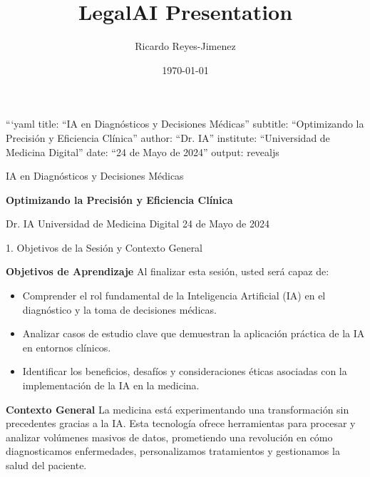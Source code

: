 \documentclass[aspectratio=169]{beamer}
\title[LegalAI Presentation]{LegalAI Presentation}
\subtitle{}
\author{Ricardo Reyes-Jimenez}
\institute{Universidad de La Sabana}
\date{\today}
\begin{document}
\begin{frame}
  \titlepage
\end{frame}

\usebackgroundtemplate{}



\begin{frame}[fragile]{}
```yaml
title: ``IA en Diagnósticos y Decisiones Médicas''
subtitle: ``Optimizando la Precisión y Eficiencia Clínica''
author: ``Dr. IA''
institute: ``Universidad de Medicina Digital''
date: ``24 de Mayo de 2024''
output: revealjs
\end{frame}



\begin{frame}[fragile]{IA en Diagnósticos y Decisiones Médicas}

\textbf{Optimizando la Precisión y Eficiencia Clínica}

Dr. IA
Universidad de Medicina Digital
24 de Mayo de 2024

\end{frame}



\begin{frame}[fragile]{1. Objetivos de la Sesión y Contexto General}


\textbf{Objetivos de Aprendizaje}
Al finalizar esta sesión, usted será capaz de:
\begin{itemize}
  \item Comprender el rol fundamental de la Inteligencia Artificial (IA) en el diagnóstico y la toma de decisiones médicas.
  \item Analizar casos de estudio clave que demuestran la aplicación práctica de la IA en entornos clínicos.
  \item Identificar los beneficios, desafíos y consideraciones éticas asociadas con la implementación de la IA en la medicina.
\end{itemize}
\textbf{Contexto General}
La medicina está experimentando una transformación sin precedentes gracias a la IA. Esta tecnología ofrece herramientas para procesar y analizar volúmenes masivos de datos, prometiendo una revolución en cómo diagnosticamos enfermedades, personalizamos tratamientos y gestionamos la salud del paciente.

\end{frame}
\end{document}
